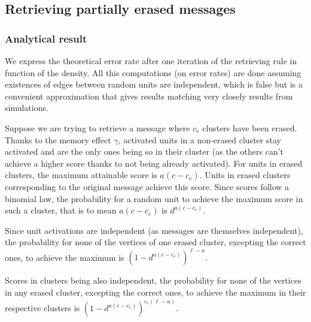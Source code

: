\documentclass[english,10pt,twocolumn]{IEEEtran}
\theoremstyle{definition}
\begin{document}
	
	\subsection{Retrieving partially erased messages}		
		
	
	\subsubsection{Analytical result}
	
	We express the theoretical error rate after one iteration of the retrieving rule in function of the density. All this computations (on error rates) are done assuming existences of edges between random units are independent, which is false but is a convenient approximation that gives results matching very closely results from simulations.
	
	Suppose we are trying to retrieve a message where $c_e$ clusters have been erased. %
	Thanks to the memory effect $\gamma$, activated units in a non-erased cluster stay activated and are the only ones being so in their cluster (as the others can't achieve a higher score thanks to not being already activated). For units in erased clusters, the maximum attainable score is $a(c - c_e)$. Units in erased clusters corresponding to the original message achieve this score. Since scores follow a binomial law, the probability for a random unit to achieve the maximum score in such a cluster, that is to mean $a(c-c_e)$ is $d^{a(c-c_e)}$.
	
	
	Since unit activations are independent (as messages are themselves independent), the probability for none of the vertices of one erased cluster, excepting the correct ones, to achieve the maximum is $\left(1 - d^	{a(c-c_e)}\right)^{\ell-a}$.
	
	Scores in clusters being also independent, the probability for none of the vertices in any erased cluster, excepting the correct ones, to achieve the maximum in their respective clusters is $\left(1 - d^	{a(c-c_e)}\right)^{c_e(\ell-a)}$.
	
\end{document}
